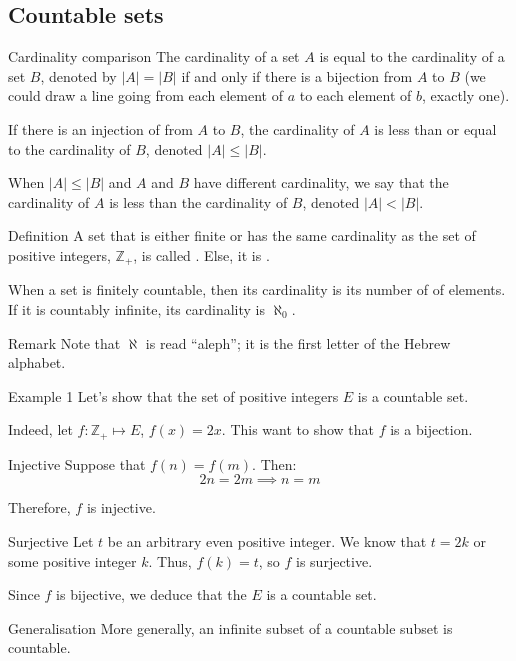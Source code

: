 \documentclass[a4paper]{article}
\begin{document}
\subsection{Countable sets}
\begin{parag}{Cardinality comparison}
    The cardinality of a set $A$ is equal to the cardinality of a set $B$, denoted by $\left|A\right| = \left|B\right|$ if and only if there is a bijection from $A$ to $B$ (we could draw a line going from each element of $a$ to each element of $b$, exactly one).

    If there is an injection of from $A$ to $B$, the cardinality of $A$ is less than or equal to the cardinality of $B$, denoted $\left|A\right| \leq \left|B\right|$.

    When $\left|A\right| \leq \left|B\right|$ and $A$ and $B$ have different cardinality, we say that the cardinality of $A$ is less than the cardinality of $B$, denoted $\left|A\right| < \left|B\right|$.
\end{parag}

\begin{parag}{Definition}
    A set that is either finite or has the same cardinality as the set of positive integers, $\mathbb{Z}_+$, is called . Else, it is .

    When a set is finitely countable, then its cardinality is its number of of elements. If it is countably infinite, its cardinality is $\aleph_0$.

    \begin{subparag}{Remark}
        Note that $\aleph$ is read ``aleph''; it is the first letter of the Hebrew alphabet.
    \end{subparag}
\end{parag}

\begin{parag}{Example 1}
    Let's show that the set of positive integers $E$ is a countable set.

    Indeed, let $f: \mathbb{Z}_+ \mapsto E$, $f\left(x\right) = 2x$. This want to show that $f$ is a bijection.

    \begin{subparag}{Injective}
        Suppose that $f\left(n\right) = f\left(m\right)$. Then:
        \[2n = 2m \implies n = m\]

        Therefore, $f$ is injective.
    \end{subparag}

    \begin{subparag}{Surjective}
        Let $t$ be an arbitrary even positive integer. We know that $t = 2k$ or some positive integer $k$. Thus, $f\left(k\right) = t$, so $f$ is surjective.
    \end{subparag}

    Since $f$ is bijective, we deduce that the $E$ is a countable set.

    \begin{subparag}{Generalisation}
        More generally, an infinite subset of a countable subset is countable.
    \end{subparag}
\end{parag}
\end{document}
